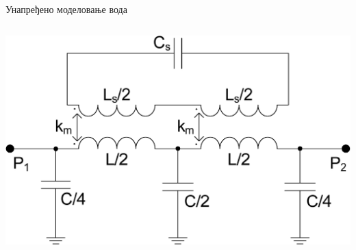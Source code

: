 \documentclass{beamer}
\begin{document}
\begin{frame}[t]{Унапређено моделовање вода}
\begin{columns}[c]
\includegraphics[scale=0.26]{sl_ekv/fig2b}
    \end{columns}
    
\end{frame}
\end{document}
